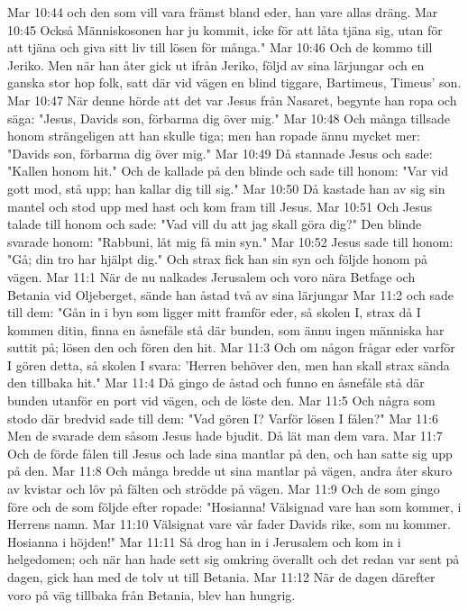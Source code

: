 Mar 10:44  och den som vill vara främst bland eder, han vare allas dräng.
Mar 10:45  Också Människosonen har ju kommit, icke för att låta tjäna sig, utan för att tjäna och giva sitt liv till lösen för många."
Mar 10:46  Och de kommo till Jeriko. Men när han åter gick ut ifrån Jeriko, följd av sina lärjungar och en ganska stor hop folk, satt där vid vägen en blind tiggare, Bartimeus, Timeus' son.
Mar 10:47  När denne hörde att det var Jesus från Nasaret, begynte han ropa och säga: "Jesus, Davids son, förbarma dig över mig."
Mar 10:48  Och många tillsade honom strängeligen att han skulle tiga; men han ropade ännu mycket mer: "Davids son, förbarma dig över mig."
Mar 10:49  Då stannade Jesus och sade: "Kallen honom hit." Och de kallade på den blinde och sade till honom: "Var vid gott mod, stå upp; han kallar dig till sig."
Mar 10:50  Då kastade han av sig sin mantel och stod upp med hast och kom fram till Jesus.
Mar 10:51  Och Jesus talade till honom och sade: "Vad vill du att jag skall göra dig?" Den blinde svarade honom: "Rabbuni, låt mig få min syn."
Mar 10:52  Jesus sade till honom: "Gå; din tro har hjälpt dig." Och strax fick han sin syn och följde honom på vägen.
Mar 11:1  När de nu nalkades Jerusalem och voro nära Betfage och Betania vid Oljeberget, sände han åstad två av sina lärjungar
Mar 11:2  och sade till dem: "Gån in i byn som ligger mitt framför eder, så skolen I, strax då I kommen ditin, finna en åsnefåle stå där bunden, som ännu ingen människa har suttit på; lösen den och fören den hit.
Mar 11:3  Och om någon frågar eder varför I gören detta, så skolen I svara: 'Herren behöver den, men han skall strax sända den tillbaka hit."
Mar 11:4  Då gingo de åstad och funno en åsnefåle stå där bunden utanför en port vid vägen, och de löste den.
Mar 11:5  Och några som stodo där bredvid sade till dem: "Vad gören I? Varför lösen I fålen?"
Mar 11:6  Men de svarade dem såsom Jesus hade bjudit. Då lät man dem vara.
Mar 11:7  Och de förde fålen till Jesus och lade sina mantlar på den, och han satte sig upp på den.
Mar 11:8  Och många bredde ut sina mantlar på vägen, andra åter skuro av kvistar och löv på fälten och strödde på vägen.
Mar 11:9  Och de som gingo före och de som följde efter ropade: "Hosianna! Välsignad vare han som kommer, i Herrens namn.
Mar 11:10  Välsignat vare vår fader Davids rike, som nu kommer. Hosianna i höjden!"
Mar 11:11  Så drog han in i Jerusalem och kom in i helgedomen; och när han hade sett sig omkring överallt och det redan var sent på dagen, gick han med de tolv ut till Betania.
Mar 11:12  När de dagen därefter voro på väg tillbaka från Betania, blev han hungrig.
